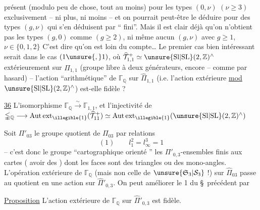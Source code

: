 présent (modulo peu de chose, tout au moins)
pour les types $(0,\nu)$ $(\nu\geq 3)$ exclusivement
-- ni plus, ni moins -- et on pourrait
peut-être le déduire pour des types $(g,\nu)$
qui s'en déduisent par `` fini''.
Mais il est clair déjà qu'on n'obtient
pas les types $(g,0)$ comme  $(g\geq 2)$,
ni même aucun $(g,\nu)$ avec $g\geq 1$, $\nu\in\{0,1,2\}$
C'est dire qu'on est loin du compte\ldots
Le premier cas bien intéressant serait
dans le cas $(1\unsure{,}1)$, où
$\widehat{\mathcal{T}}_{1,1}^{+}\simeq
\unsure{\mathrm{Sl}|\mathrm{SL}}(2,\mathbb{Z})^{\wedge}$
 extérieurement sur $\widehat{\Pi}_{1,1}$
(groupe libre à deux générateurs, encore
-- comme par hasard) -- l'action
``arithmétique'' de $\mathbb{\Gamma}_{\mathbb{Q}}$ sur $\widehat{\Pi}_{1,1}$
(i.e. l'action extérieure \uline{mod}
$\unsure{\mathrm{Sl}|\mathrm{SL}}(2,\mathbb{Z})^{\wedge}$)
est-elle fidèle ?

\uline{36} L'isomorphisme
$\mathbb{\Gamma}_{\mathbb{Q}}\xrightarrow{\sim}\mathbb{\Gamma}_{1,1}$,
et l'injectivité de
$\mathbb{\Gamma}_{\mathbb{Q}}\longrightarrow
\mathrm{Aut\,ext}_{\illegible{1}}(\widehat{\mathcal{T}}_{11}^{+})
\simeq\mathrm{Aut\,ext}_{\illegible{1}}(\unsure{\mathrm{Sl}|\mathrm{SL}}(2,\mathbb{Z})^{\wedge})$

Soit $\Pi'_{03}$ le groupe quotient de $\Pi_{03}$
 par  relations
\[
(1)\qquad l_1^2=l_\infty^3=1
\]
-- c'est donc le groupe ``cartographique
orienté ''\unsure{,|;}
 les $\Pi'_{0,3}$-ensembles
finis   aux cartes
  ( avoir des
 ) dont les faces sont des
triangles ou des mono-angles. L'opération
extérieure de $\mathbb{\Gamma}_{\mathbb{Q}}$
(mais non celle de $\unsure{\mathfrak{S}_3|\mathcal{S}_3}$ !)
sur $\widehat{\Pi}_{03}$ passe au quotient en une
action sur $\widehat{\Pi}'_{0,3}$. On peut améliorer le
 1 du \S\ précédent par 

\uline{Proposition} L'action extérieure de $\mathbb{\Gamma}_{\mathbb{Q}}$
sur $\widehat{\Pi}'_{0,3}$ est fidèle.

